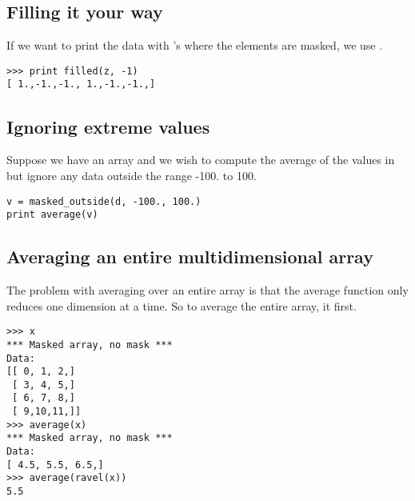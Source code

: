 \subsection{Filling it your way}
\label{sec:numarray.ma:filling-it-your-way}

If we want to print the data with 's where the elements are
masked, we use .
\begin{verbatim}
>>> print filled(z, -1)
[ 1.,-1.,-1., 1.,-1.,-1.,]
\end{verbatim}



\subsection{Ignoring extreme values}
\label{sec:numarray.ma:ignore-extreme-values}

Suppose we have an array  and we wish to compute the average of the
values in  but ignore any data outside the range -100. to 100.
\begin{verbatim}
v = masked_outside(d, -100., 100.)
print average(v)
\end{verbatim}


\subsection{Averaging an entire multidimensional array}
\label{sec:numarray.ma:averaging-an-entire}

The problem with averaging over an entire array is that the average function
only reduces one dimension at a time. So to average the entire array,
 it first.
\begin{verbatim}
>>> x
*** Masked array, no mask ***
Data:
[[ 0, 1, 2,]
 [ 3, 4, 5,]
 [ 6, 7, 8,]
 [ 9,10,11,]]
>>> average(x)
*** Masked array, no mask ***
Data:
[ 4.5, 5.5, 6.5,]
>>> average(ravel(x))
5.5
\end{verbatim}




